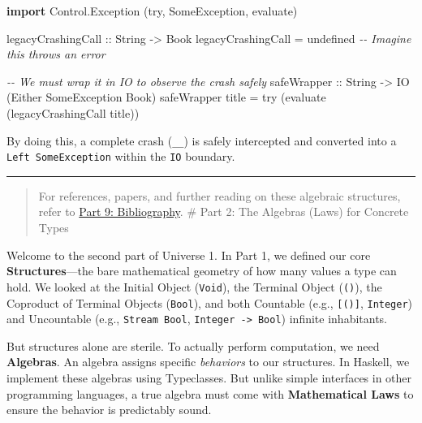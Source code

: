 \documentclass[
]{article}
\newenvironment{Shaded}{}{}
\newcommand{\CommentTok}[1]{\textcolor[rgb]{0.38,0.63,0.69}{\textit{#1}}}
\newcommand{\DataTypeTok}[1]{\textcolor[rgb]{0.56,0.13,0.00}{#1}}
\newcommand{\FunctionTok}[1]{\textcolor[rgb]{0.02,0.16,0.49}{#1}}
\newcommand{\KeywordTok}[1]{\textcolor[rgb]{0.00,0.44,0.13}{\textbf{#1}}}
\newcommand{\NormalTok}[1]{#1}
\newcommand{\OtherTok}[1]{\textcolor[rgb]{0.00,0.44,0.13}{#1}}
\begin{document}
\begin{Shaded}
\begin{Highlighting}[]
\KeywordTok{import} \DataTypeTok{Control.Exception}\NormalTok{ (try, }\DataTypeTok{SomeException}\NormalTok{, evaluate)}

\OtherTok{legacyCrashingCall ::} \DataTypeTok{String} \OtherTok{{-}\textgreater{}} \DataTypeTok{Book}
\NormalTok{legacyCrashingCall }\OtherTok{=} \FunctionTok{undefined} \CommentTok{{-}{-} Imagine this throws an error}

\CommentTok{{-}{-} We must wrap it in IO to observe the crash safely}
\OtherTok{safeWrapper ::} \DataTypeTok{String} \OtherTok{{-}\textgreater{}} \DataTypeTok{IO}\NormalTok{ (}\DataTypeTok{Either} \DataTypeTok{SomeException} \DataTypeTok{Book}\NormalTok{)}
\NormalTok{safeWrapper title }\OtherTok{=}\NormalTok{ try (evaluate (legacyCrashingCall title))}
\end{Highlighting}
\end{Shaded}

By doing this, a complete crash (\texttt{\_\textbar{}\_}) is safely
intercepted and converted into a \texttt{Left\ SomeException} within the
\texttt{IO} boundary.

\begin{center}\rule{0.5\linewidth}{0.5pt}\end{center}

\begin{quote}
For references, papers, and further reading on these algebraic
structures, refer to \href{09_bibliography.md}{Part 9: Bibliography}. \#
Part 2: The Algebras (Laws) for Concrete Types
\end{quote}

Welcome to the second part of Universe 1. In Part 1, we defined our core
\textbf{Structures}---the bare mathematical geometry of how many values
a type can hold. We looked at the Initial Object (\texttt{Void}), the
Terminal Object (\texttt{()}), the Coproduct of Terminal Objects
(\texttt{Bool}), and both Countable (e.g., \texttt{{[}(){]}},
\texttt{Integer}) and Uncountable (e.g., \texttt{Stream\ Bool},
\texttt{Integer\ -\textgreater{}\ Bool}) infinite inhabitants.

But structures alone are sterile. To actually perform computation, we
need \textbf{Algebras}. An algebra assigns specific \emph{behaviors} to
our structures. In Haskell, we implement these algebras using
Typeclasses. But unlike simple interfaces in other programming
languages, a true algebra must come with \textbf{Mathematical Laws} to
ensure the behavior is predictably sound.
\end{document}
